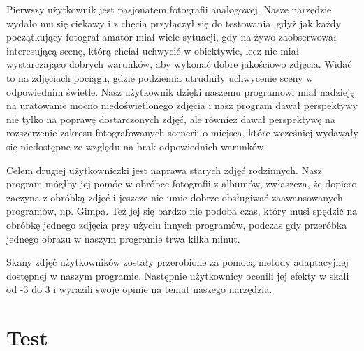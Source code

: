 \documentclass[]{mwart}
\begin{document}
Pierwszy użytkownik jest pasjonatem fotografii analogowej. Nasze narzędzie wydało mu się ciekawy i z chęcią przyłączył się do testowania, gdyż jak każdy początkujący fotograf-amator miał wiele sytuacji, gdy na żywo zaobserwował interesującą scenę, którą chciał uchwycić w obiektywie, lecz nie miał wystarczająco dobrych warunków, aby wykonać dobre jakościowo zdjęcia. Widać to na zdjęciach pociągu, gdzie podziemia utrudniły uchwycenie sceny w odpowiednim świetle. Nasz użytkownik dzięki naszemu programowi miał nadzieję na uratowanie mocno niedoświetlonego zdjęcia i nasz program dawał perspektywy nie tylko na poprawę dostarczonych zdjęć, ale również dawał perspektywę na rozszerzenie zakresu fotografowanych scenerii o miejsca, które wcześniej wydawały się niedostępne ze względu na brak odpowiednich warunków. \newline

Celem drugiej użytkowniczki jest naprawa starych zdjęć rodzinnych. Nasz program mógłby jej pomóc w obróbce fotografii z albumów, zwłaszcza, że dopiero zaczyna z obróbką zdjęć i jeszcze nie umie dobrze obsługiwać zaawansowanych programów, np. Gimpa. Też jej się bardzo nie podoba czas, który musi spędzić na obróbkę jednego zdjęcia przy użyciu innych programów, podczas gdy przeróbka jednego obrazu w naszym programie trwa kilka minut. \newline

Skany zdjęć użytkowników zostały przerobione za pomocą metody adaptacyjnej dostępnej w naszym programie. Następnie użytkownicy ocenili jej efekty w skali od -3 do 3 i wyrazili swoje opinie na temat naszego narzędzia.





\newpage
\section{Test}
\end{document}
